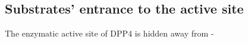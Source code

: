 \subsection{Substrates' entrance to the active site}

The enzymatic active site of DPP4 is hidden away from \beta-